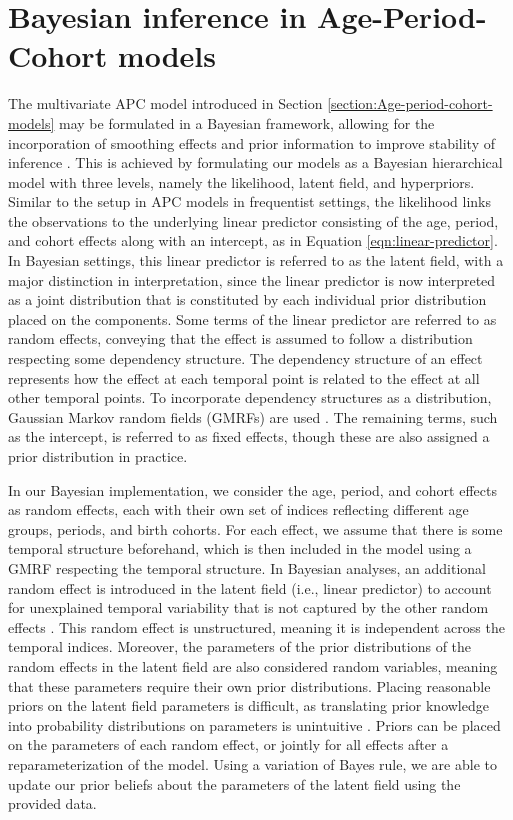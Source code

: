 \section{Bayesian inference in Age-Period-Cohort models}\label{section:BayesianInference}
The multivariate APC model introduced in Section \ref{section:Age-period-cohort-models} may be formulated in a Bayesian framework, allowing for the incorporation of smoothing effects and prior information to improve stability of inference \citep{APC-Bayesian-Andrea}. This is achieved by formulating our models as a Bayesian hierarchical model with three levels, namely the likelihood, latent field, and hyperpriors. Similar to the setup in APC models in frequentist settings, the likelihood links the observations to the underlying linear predictor consisting of the age, period, and cohort effects along with an intercept, as in Equation \eqref{eqn:linear-predictor}. In Bayesian settings, this linear predictor is referred to as the latent field, with a major distinction in interpretation, since the linear predictor is now interpreted as a joint distribution that is constituted by each individual prior distribution placed on the components. Some terms of the linear predictor are referred to as random effects, conveying that the effect is assumed to follow a distribution respecting some dependency structure. The dependency structure of an effect represents how the effect at each temporal point is related to the effect at all other temporal points. To incorporate dependency structures as a distribution, Gaussian Markov random fields (GMRFs) are used \citep{GMRF}. The remaining terms, such as the intercept, is referred to as fixed effects, though these are also assigned a prior distribution in practice.

In our Bayesian implementation, we consider the age, period, and cohort effects as random effects, each with their own set of indices reflecting different age groups, periods, and birth cohorts. For each effect, we assume that there is some temporal structure beforehand, which is then included in the model using a GMRF respecting the temporal structure. In Bayesian analyses, an additional random effect is introduced in the latent field (i.e., linear predictor) to account for unexplained temporal variability that is not captured by the other random effects \citep{APC-Bayesian-Andrea}. This random effect is unstructured, meaning it is independent across the temporal indices. Moreover, the parameters of the prior distributions of the random effects in the latent field are also considered random variables, meaning that these parameters require their own prior distributions. Placing reasonable priors on the latent field parameters is difficult, as translating prior knowledge into probability distributions on parameters is unintuitive \citep{PC-priors}. Priors can be placed on the parameters of each random effect, or jointly for all effects after a reparameterization of the model. Using a variation of Bayes rule, we are able to update our prior beliefs about the parameters of the latent field using the provided data.


